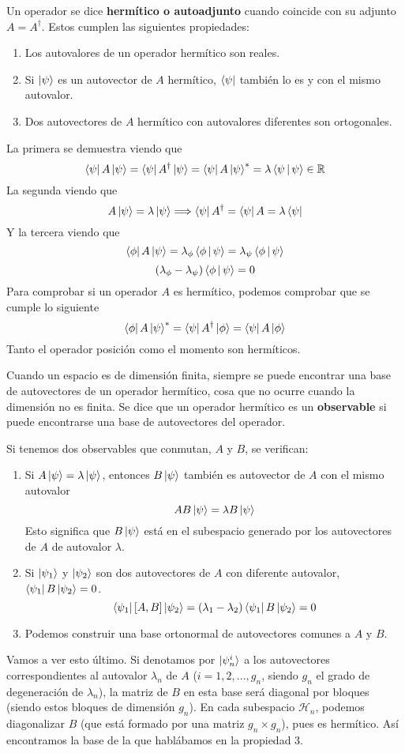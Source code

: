 \documentclass[12pt]{report}
\begin{document}
Un operador se dice \textbf{hermítico o autoadjunto} cuando coincide con su adjunto $A=A^{\dagger}$. Estos cumplen las siguientes propiedades:
\begin{enumerate}
	\item Los autovalores de un operador hermítico son reales.
	\item Si $\ket{\psi }$ es un autovector de $A$ hermítico, $\bra{\psi }$ también lo es y con el mismo autovalor.
	\item Dos autovectores de $A$ hermítico con autovalores diferentes son ortogonales.
\end{enumerate}
La primera se demuestra viendo que 
\[ \bra{\psi }A\ket{\psi }=\bra{\psi }A^{\dagger}\ket{\psi }=\bra{\psi }A\ket{\psi }^{\ast}=\lambda\Braket{\psi |\psi}\in\mathbb{R} \]
La segunda viendo que
\[ A\ket{\psi }=\lambda\ket{\psi }\Longrightarrow \bra{\psi }A^{\dagger}=\bra{\psi }A=\lambda\bra{\psi } \]
Y la tercera viendo que
\[ \bra{\phi }A\ket{\psi }=\lambda_{\phi }\Braket{\phi |\psi}=\lambda_{\psi }\Braket{\phi |\psi} \]
\[ (\lambda_{\phi }-\lambda_{\psi })\Braket{\phi |\psi }=0 \]
Para comprobar si un operador $A$ es hermítico, podemos comprobar que se cumple lo siguiente
\begin{equation}
\bra{\phi }A\ket{\psi }^{\ast }=\bra{\psi }A^{\dagger}\ket{\phi }=\bra{\psi }A\ket{\phi }
\end{equation}
Tanto el operador posición como el momento son hermíticos.

Cuando un espacio es de dimensión finita, siempre se puede encontrar una base de autovectores de un operador hermítico, cosa que no ocurre cuando la dimensión no es finita. Se dice que un operador hermítico es un \textbf{observable} si puede encontrarse una base de autovectores del operador.

Si tenemos dos observables que conmutan, $A$ y $B$, se verifican:
\begin{enumerate}
	\item  Si $A\ket{\psi }=\lambda\ket{\psi }$, entonces $B\ket{\psi }$ también es autovector de $A$ con el mismo autovalor
\[ AB\ket{\psi }=\lambda B\ket{\psi} \]
Esto significa que $B\ket{\psi }$ está en el subespacio generado por los autovectores de $A$ de autovalor $\lambda$. 
	\item Si $\ket{\psi_{1}}$ y $\ket{\psi_{2}}$ son dos autovectores de $A$ con diferente autovalor, $\bra{\psi_{1}}B\ket{\psi_{2}}=0$.
	\[ \bra{\psi_{1}}[A,B]\ket{\psi_{2}}=(\lambda_{1}-\lambda_{2})\bra{\psi_{1}}B\ket{\psi_{2}}=0 \]
	\item Podemos construir una base ortonormal de autovectores comunes a $A$ y $B$.
\end{enumerate}
Vamos a ver esto último. Si denotamos por $\ket{\psi_{n}^{i}}$ a los autovectores correspondientes al autovalor $\lambda_{n}$ de $A$ ($i=1,2,...,g_{n}$, siendo $g_{n}$ el grado de degeneración de $\lambda_{n}$), la matriz de $B$ en esta base será diagonal por bloques (siendo estos bloques de dimensión $g_{n}$). En cada subespacio $\mathcal{H}_{n}$, podemos diagonalizar $B$ (que está formado por una matriz $g_{n}\times g_{n}$), pues es hermítico. Así encontramos la base de la que hablábamos en la propiedad 3.
\end{document}
